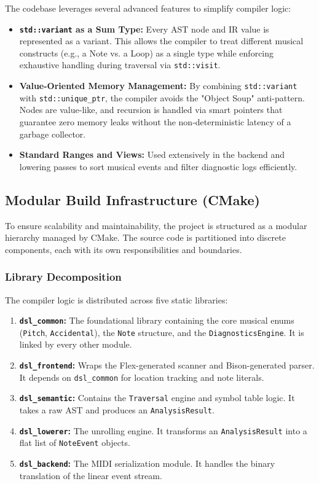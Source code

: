 The codebase leverages several advanced features to simplify compiler logic:
\begin{itemize}
    \item \textbf{\texttt{std::variant} as a Sum Type:} Every AST node and IR value is represented as a variant. This allows the compiler to treat different musical constructs (e.g., a Note vs. a Loop) as a single type while enforcing exhaustive handling during traversal via \texttt{std::visit}.
    \item \textbf{Value-Oriented Memory Management:} By combining \texttt{std::variant} with \texttt{std::unique\_ptr}, the compiler avoids the "Object Soup" anti-pattern. Nodes are value-like, and recursion is handled via smart pointers that guarantee zero memory leaks without the non-deterministic latency of a garbage collector.
    \item \textbf{Standard Ranges and Views:} Used extensively in the backend and lowering passes to sort musical events and filter diagnostic logs efficiently.
\end{itemize}

\subsection{Modular Build Infrastructure (CMake)}

To ensure scalability and maintainability, the project is structured as a modular hierarchy managed by CMake.
The source code is partitioned into discrete components, each with its own responsibilities and boundaries.

\subsubsection{Library Decomposition}

The compiler logic is distributed across five static libraries:
\begin{enumerate}
    \item \textbf{\texttt{dsl\_common}:} The foundational library containing the core musical enums (\texttt{Pitch}, \texttt{Accidental}), the \texttt{Note} structure, and the \texttt{DiagnosticsEngine}. It is linked by every other module.
    \item \textbf{\texttt{dsl\_frontend}:} Wraps the Flex-generated scanner and Bison-generated parser. It depends on \texttt{dsl\_common} for location tracking and note literals.
    \item \textbf{\texttt{dsl\_semantic}:} Contains the \texttt{Traversal} engine and symbol table logic. It takes a raw AST and produces an \texttt{AnalysisResult}.
    \item \textbf{\texttt{dsl\_lowerer}:} The unrolling engine. It transforms an \texttt{AnalysisResult} into a flat list of \texttt{NoteEvent} objects.
    \item \textbf{\texttt{dsl\_backend}:} The MIDI serialization module. It handles the binary translation of the linear event stream.
\end{enumerate}

